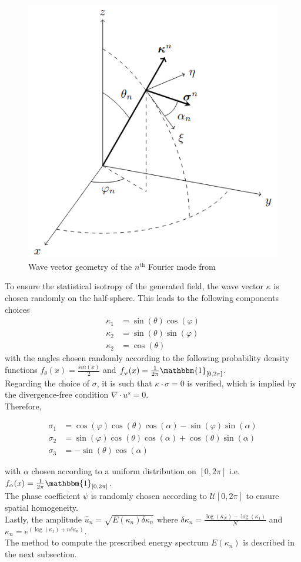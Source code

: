 \documentclass[a4paper,12pt]{article}
\theoremstyle{definition}
\begin{document}
\begin{figure}[H]
    \centering
    \includegraphics[width=0.5\linewidth]{illustrations/WaveVectorGeometry.png}
    \caption{Wave vector geometry of the $n^\text{th}$ Fourier mode from \cite{Janin2021}}
    \label{WaveVectorGeometry}
\end{figure}
To ensure the statistical isotropy of the generated field, the wave vector $\kappa$ is chosen randomly on the half-sphere.
This leads to the following components choices
\begin{align}
    \kappa_1 &= \sin(\theta)\cos(\varphi) \label{kappa1}\\ 
    \kappa_2 &= \sin(\theta)\sin(\varphi) \label{kappa2}\\
    \kappa_2 & = \cos(\theta) \label{kappa3}
\end{align}
with the angles chosen randomly according to the following probability density functions $f_\theta(x)=\frac{sin(x)}{2}$ and $f_\varphi(x)=\frac{1}{2\pi}\mathbbm{1}_{[0,2\pi]}$. \\
Regarding the choice of $\sigma$, it is such that $\kappa\cdot\sigma=0$ is verified, which is implied by the divergence-free condition $\nabla\cdot u^s=0$. \\
Therefore, 

\begin{align}
    \sigma_1&=\cos(\varphi)\cos(\theta)\cos(\alpha)-\sin(\varphi)\sin(\alpha) \label{sigma1}\\
    \sigma_2&=\sin(\varphi)\cos(\theta)\cos(\alpha)+\cos(\theta)\sin(\alpha) \label{sigma2}\\
    \sigma_3&=-\sin(\theta)\cos(\alpha) \label{sigma3}
\end{align}

with $\alpha$ chosen according to a uniform distribution on $[0,2\pi]$ i.e. $f_\alpha(x)=\frac{1}{2\pi}\mathbbm{1}_{[0,2\pi]}$. \\
The phase coefficient $\psi$ is randomly chosen according to $\mathcal{U}[0,2\pi]$ to ensure spatial homogeneity. \\
Lastly, the amplitude $\hat{u}_n=\sqrt{E(\kappa_n)\delta \kappa_n}$ where $\delta \kappa_n = \frac{\log(\kappa_N)-\log(\kappa_1)}{N}$ and $\kappa_n=e^{(\log(\kappa_1)+n\delta \kappa_n)}$. \\
The method to compute the prescribed energy spectrum $E(\kappa_n)$ is described in the next subsection.
\end{document}
